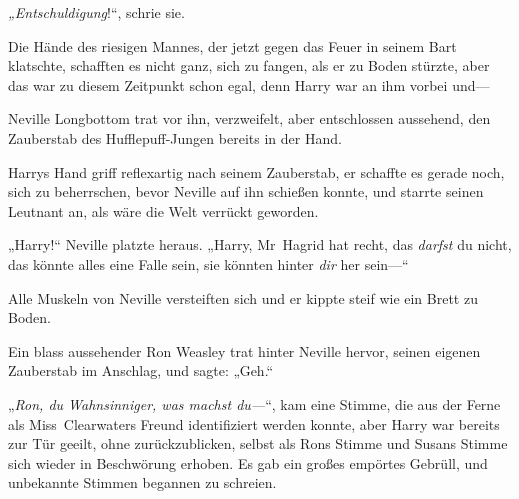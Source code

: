 \emph{„Entschuldigung}!“, schrie sie.  

Die Hände des riesigen Mannes, der jetzt gegen das Feuer in seinem Bart klatschte, schafften es nicht ganz, sich zu fangen, als er zu Boden stürzte, aber das war zu diesem Zeitpunkt schon egal, denn Harry war an ihm vorbei und—

Neville Longbottom trat vor ihn, verzweifelt, aber entschlossen aussehend, den Zauberstab des Hufflepuff-Jungen bereits in der Hand.

Harrys Hand griff reflexartig nach seinem Zauberstab, er schaffte es gerade noch, sich zu beherrschen, bevor Neville auf ihn schießen konnte, und starrte seinen Leutnant an, als wäre die Welt verrückt geworden.

„Harry!“ Neville platzte heraus.
„Harry, Mr~Hagrid hat recht, das \emph{darfst} du nicht, das könnte alles eine Falle sein, sie könnten hinter \emph{dir} her sein—“

Alle Muskeln von Neville versteiften sich und er kippte steif wie ein Brett zu Boden.

Ein blass aussehender Ron Weasley trat hinter Neville hervor, seinen eigenen Zauberstab im Anschlag, und sagte:
„Geh.“

„\emph{Ron, du Wahnsinniger, was machst du—}“, kam eine Stimme, die aus der Ferne als Miss~Clearwaters Freund identifiziert werden konnte, aber Harry war bereits zur Tür geeilt, ohne zurückzublicken, selbst als Rons Stimme und Susans Stimme sich wieder in Beschwörung erhoben. Es gab ein großes empörtes Gebrüll, und unbekannte Stimmen begannen zu schreien.

